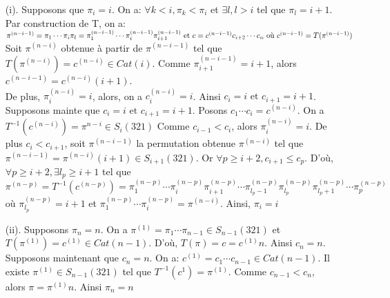\documentclass[12pt,a4paper]{extreport}
\begin{document}
		\begin{itemize}
			\item[(i).] Supposons que $\pi_{i} = i $. On a:  $\forall k<i, \pi_{k}<\pi_{i} $ 	et $\exists l, l>i $ tel que $\pi_{l}=i+1$. Par construction de T, on a:  
				$
					\pi^{(n-i-1)} = \pi_{1} \cdots \pi_{i}\pi_{l}=  \pi_{1}^{(n-i-1)} \cdots \pi_{i}^{(n-i-1)}\pi_{i+1}^{(n-i-1)} \text{ et } c = c^{(n-i-1)} c_{i+2} \cdots c_{n}\\ \text{ où } c^{(n-i-1)} = T(\pi^{(n-i-1)})
				$
				Soit $\pi^{(n-i)}$ obtenue à partir de $\pi^{(n-i-1)}$ tel que\\
				$T(\pi^{(n-i)})= c^{(n-i)} \in Cat(i)$. Comme $\pi_{i+1}^{(n-i-1)}=i+1$, alors $c^{(n-i-1)}= c^{(n-i)}(i+1) $.\\
				 De plus, $\pi_{i}^{(n-i)}= i$, alors, on a $c_{i}^{(n-i)}=i$. Ainsi $c_{i}=i \text{ et } c_{i+1} = i+1 $.
				Supposons mainte que $c_{i}=i \text{ et } c_{i+1} = i+1 $. Posons $c_{1}\cdots c_{i} = c^{(n-i)} $. On a $T^{-1}(c^{(n-i)}) = \pi^{n-i}\in S_{i}(321)$
				Comme $c_{i-1}< c_{i} $, alors  $\pi_{i}^{(n-i)} = i $. De plus $c_{i}<c_{i+1} $, soit $\pi^{(n-i-1)} $ la permutation obtenue $\pi^{(n-i)}$ tel que $\pi^{(n-i-1)} = \pi^{(n-i)}(i+1) \in S_{i+1}(321) $. Or $\forall p \geq i+2, c_{i+1}\leq c_{p}$. D'où, $\forall p \geq i+2, \exists l_{p}\geq i+1 $ tel que\\
				$\pi^{(n-p)} = T^{-1}(c^{(n-p)}) = \pi^{(n-p)}_{1} \cdots \pi^{(n-p)}_{i}\pi^{(n-p)}_{i+1} \cdots \pi^{(n-p)}_{l_{p}-1}\pi^{(n-p)}_{l_{p}}\pi^{(n-p)}_{l_{p}+1} \cdots \pi^{(n-p)}_{p} $ \\
				où $\pi^{(n-p)}_{l_{p}}=i+1$ et $\pi^{(n-p)}_{1} \cdots \pi^{(n-p)}_{i} = \pi^{(n-i)} $. Ainsi, $\pi_{i}=i$

			\item[(ii).] Supposons $\pi_{n}=n$. On a $ \pi^{(1)}= \pi_{1}\cdots \pi_{n-1} \in S_{n-1}(321) $ et $T(\pi^{(1)}) = c^{(1)}\in Cat(n-1) $. D'où, $T(\pi) = c = c^{(1)}n $. Ainsi $c_{n}=n$.\\
			Supposons maintenant que $c_{n}=n$. On a: $c^{(1)} = c_{1} \cdots c_{n-1} \in Cat(n-1) $. Il existe $\pi^{(1)} \in S_{n-1}(321) $ tel que $T^{-1}(c^{1})=\pi^{(1)}$. Comme $c_{n-1} <c_{n} $, alors $\pi = \pi^{(1)}n$. Ainsi $\pi_{n}=n$
		\end{itemize}
\end{document}
